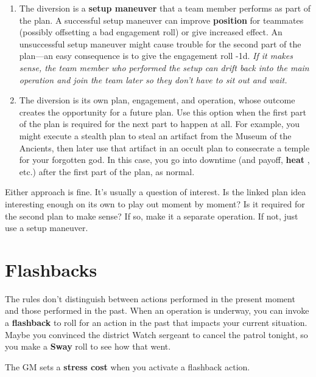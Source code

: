 \documentclass[11pt,fleqn,a5paper]{book}
\newcommand{\gameterm}[1]{\textbf{#1}}
\begin{document}
\begin{enumerate}
	\item The diversion is a \textbf{setup maneuver} that a team member performs as part of the plan. A successful setup maneuver can improve \textbf{position} for teammates (possibly offsetting a bad engagement roll) or give increased effect.  An unsuccessful setup maneuver might cause trouble for the second part of the plan---an easy consequence is to give the engagement roll -1d. \emph{If it makes sense, the team member who performed the setup can drift back into the main operation and join the team later so they don’t have to sit out and wait.}
	\item The diversion is its own plan, engagement, and operation, whose outcome creates the opportunity for a future plan. Use this option when the first part of the plan is required for the next part to happen at all. For example, you might execute a stealth plan to steal an artifact from the Museum of the Ancients, then later use that artifact in an occult plan to consecrate a temple for your forgotten god. In this case, you go into downtime (and payoff, \gameterm{heat} , etc.) after the first part of the plan, as normal.
\end{enumerate}

Either approach is fine. It’s usually a question of interest. Is the linked plan idea interesting enough on its own to play out moment by moment? Is it required for the second plan to make sense? If so, make it a separate operation. If not, just use a setup maneuver.

\section{Flashbacks}

The rules don’t distinguish between actions performed in the present moment and those performed in the past. When an operation is underway, you can invoke a \textbf{flashback} to roll for an action in the past that impacts your current situation. Maybe you convinced the district Watch sergeant to cancel the patrol tonight, so you make a \gameterm{Sway}  roll to see how that went.

The GM sets a \textbf{stress cost} when you activate a flashback action.
\end{document}
